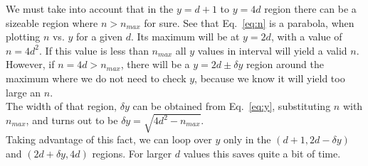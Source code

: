 \documentclass[english]{article}
\begin{document}
We must take into account that in the $y = d+1$ to $y = 4d$ region there can be a sizeable region where $n > n_{max}$ for sure. See that Eq.~\ref{eq:n} is a parabola, when plotting $n$ vs. $y$ for a given $d$. Its maximum will be at $y = 2d$, with a value of $n = 4d^2$. If this value is less than $n_{max}$ all $y$ values in interval will yield a valid $n$. However, if $n = 4d > n_{max}$, there will be a $y = 2d \pm \delta y$ region around the maximum where we do not need to check $y$, because we know it will yield too large an $n$.\\

The width of that region, $\delta y$ can be obtained from Eq.~\ref{eq:y}, substituting $n$ with $n_{max}$, and turns out to be $\delta y = \sqrt{4d^2-n_{max}}$.\\

Taking advantage of this fact, we can loop over $y$ only in the $(d+1, 2d - \delta y)$ and $(2d + \delta y, 4d)$ regions. For larger $d$ values this saves quite a bit of time.
\end{document}
